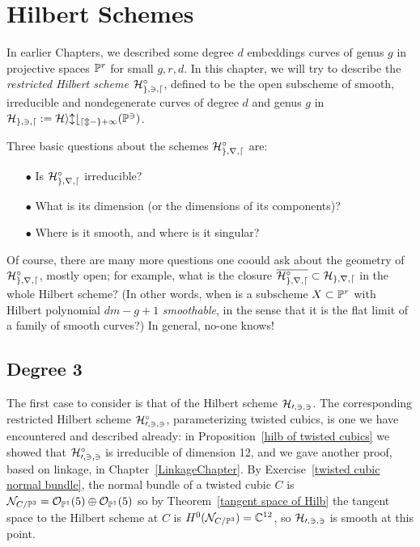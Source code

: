 

\chapter{Hilbert Schemes}
\label{HilbertSchemesChapter}

In earlier Chapters, we described some  degree $d$ embeddings curves of  genus $g$ in projective spaces ${\mathbb P}^r$ for small $g,r,d$. In this chapter, we will try to describe the \emph{restricted Hilbert scheme} $\cal H^\circ_{g,3,d}$, defined to be the open subscheme of  smooth, irreducible and nondegenerate curves of degree $d$ and genus $g$ in 
$\cal H_{g,3,d} := Hilb_{dm-g+1}({\mathbb P}^3)$.

Three basic questions about the schemes $\cal H^\circ_{g,r,d}$ are:

\begin{enumerate}
\item[$\bullet$] Is $\cal H^\circ_{g,r,d}$ irreducible? 
\item[$\bullet$]  What is its dimension (or the dimensions of its components)?
\item[$\bullet$] Where is it smooth, and where is it singular?
\end{enumerate}

Of course, there are many more questions one coould ask about the geometry of $\cal H^\circ_{g,r,d}$, mostly open;  for example,  what is the closure $\overline{\cal H^\circ_{g,r,d}} \subset \cal H_{g,r,d}$ in the whole Hilbert scheme? (In other words, when is a subscheme $X \subset {\mathbb P}^r$ with Hilbert polynomial $dm-g+1$ \emph{smoothable}, in the sense that it is the flat limit of a family of smooth curves?) In general, no-one knows!


\section{Degree 3}

The first case to consider is that of the Hilbert scheme  $\cal H_{0,3,3}$. The corresponding restricted Hilbert scheme $\cal H^\circ_{0,3,3}$, parameterizing twisted cubics, is one we have encountered and described already: in Proposition~\ref{hilb of twisted cubics} we showed that $\cal H^\circ_{0,3,3}$ is irreducible of dimension 12,
and we gave another proof, based on linkage, in Chapter~\ref{LinkageChapter}. 
By Exercise~\ref{twisted cubic normal bundle}, the normal bundle of a twisted cubic $C$ is ${\mathcal N}_{C/{\mathbb P}^3}={\mathcal O}_{{\mathbb P}^1}(5)\oplus {\mathcal O}_{{\mathbb P}^1}(5)$
so by Theorem~\ref{tangent space of Hilb} the tangent space to the Hilbert scheme at $C$ is
$H^0({\mathcal N}_{C/{\mathbb P}^3}) = {\mathbb C}^{12}$, so $\cal H_{0,3,3}$ is smooth at this point.

